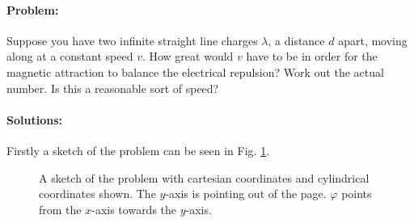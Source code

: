\paragraph{Problem:} Suppose you have two infinite straight line charges $\lambda$, a distance $d$ apart, moving along at a constant speed $v$. How great would $v$ have to be in order for the magnetic attraction to balance the electrical repulsion? Work out the actual number. Is this a reasonable sort of speed?

\paragraph{Solutions:} Firstly a sketch of the problem can be seen in Fig. \ref{fig:sketch}.

\begin{figure}[H]
    \centering
    
    \caption{A sketch of the problem with cartesian coordinates and cylindrical coordinates shown. The $y$-axis is pointing out of the page. $\varphi$ points from the $x$-axis towards the $y$-axis. }
    \label{fig:sketch}
\end{figure}

